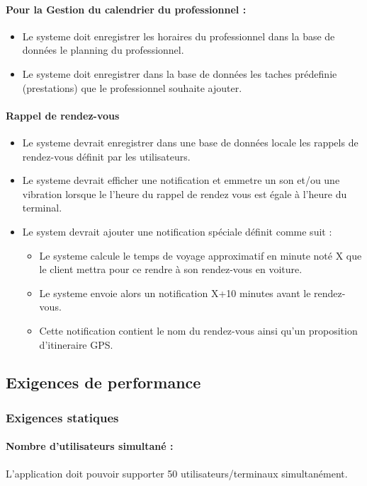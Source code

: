 \documentclass{article}
\begin{document}
\paragraph{Pour la Gestion du calendrier du professionnel :}
\begin{itemize}
\item Le systeme doit enregistrer les horaires du professionnel dans
  la base de données le planning du professionnel.
\item Le systeme doit enregistrer dans la base de données les taches
  prédefinie (prestations) que le professionnel souhaite ajouter.
\end{itemize}

\paragraph{Rappel de rendez-vous}
\begin{itemize}
\item Le systeme devrait enregistrer dans une base de données locale les
  rappels de rendez-vous définit par les utilisateurs.
\item Le systeme devrait efficher une notification et emmetre un son
  et/ou une vibration lorsque le l'heure du rappel de rendez vous est
  égale à l'heure du terminal.
\item Le system devrait ajouter une notification spéciale définit
  comme suit :
  \begin{itemize}
    \item Le systeme calcule le temps de voyage approximatif en minute
      noté X que le
      client mettra pour ce rendre à son rendez-vous en voiture.
     \item Le systeme envoie alors un notification X+10 minutes avant
       le rendez-vous.
     \item Cette notification contient le nom du rendez-vous ainsi
       qu'un proposition d'itineraire GPS.
  \end{itemize}

\end{itemize}

\subsection{Exigences de performance}
\subsubsection{Exigences statiques}
\paragraph{Nombre d'utilisateurs simultané :}
L'application doit pouvoir supporter 50 utilisateurs/terminaux
simultanément.
\end{document}

